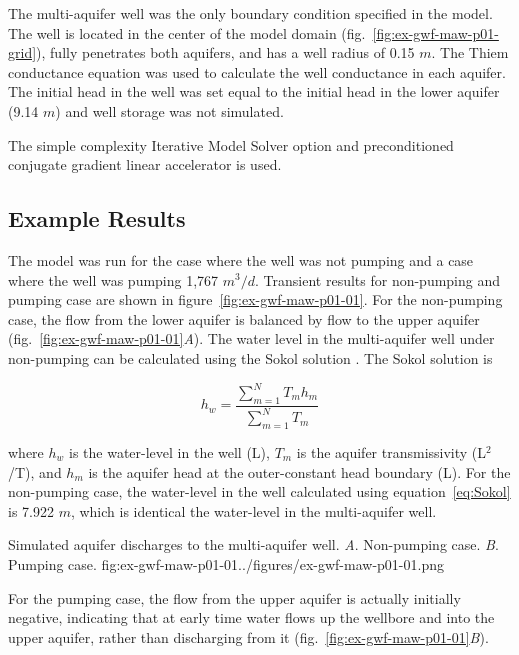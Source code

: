 The multi-aquifer well was the only boundary condition specified in the model. The well is located in the center of the model domain (fig.~\ref{fig:ex-gwf-maw-p01-grid}), fully penetrates both aquifers, and has a well radius of 0.15 $m$. The Thiem conductance equation was used to calculate the well conductance in each aquifer. The initial head in the well was set equal to the initial head in the lower aquifer (9.14 $m$) and well storage was not simulated.

The simple complexity Iterative Model Solver option and preconditioned conjugate gradient linear accelerator is used.

\subsection{Example Results}

The model was run for the case where the well was not pumping and a case where the well was pumping 1,767 $m^{3}/d$. Transient results for non-pumping and pumping case are shown in figure~\ref{fig:ex-gwf-maw-p01-01}. For the non-pumping case, the flow from the lower aquifer is balanced by flow to the upper aquifer (fig.~\ref{fig:ex-gwf-maw-p01-01}\textit{A}). The water level in the multi-aquifer well under non-pumping can be calculated using the Sokol solution \citep{sokol1963position}. The Sokol solution is

\begin{equation}
	\label{eq:Sokol}
	h_w = \frac{\sum\limits_{m=1}^{N} T_m h_m}{\sum\limits_{m=1}^{N} T_m}
\end{equation}

\noindent where $h_w$ is the water-level in the well (L), $T_m$ is the aquifer transmissivity (L$^{2}$/T), and $h_m$ is the aquifer head at the outer-constant head boundary (L). For the non-pumping case, the water-level in the well calculated using equation~\ref{eq:Sokol} is 7.922 $m$, which is identical the water-level in the multi-aquifer well.


\begin{StandardFigure}{
                                     Simulated aquifer discharges to the multi-aquifer well. 
                                     \textit{A}. Non-pumping case.
                                     \textit{B}. Pumping case.
                                     }{fig:ex-gwf-maw-p01-01}{../figures/ex-gwf-maw-p01-01.png}
\end{StandardFigure}                                 

For the pumping case, the flow from the upper aquifer is actually initially negative, indicating that at early time water flows up the wellbore and into the upper aquifer, rather than discharging from it (fig.~\ref{fig:ex-gwf-maw-p01-01}\textit{B}).
